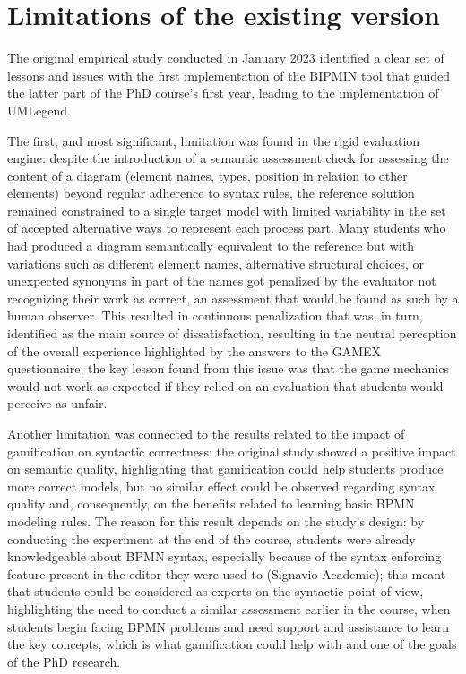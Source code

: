 \section{Limitations of the existing version}

The original empirical study conducted in January 2023 identified a clear set of lessons and issues with the first implementation of the BIPMIN tool that guided the latter part of the PhD course's first year, leading to the implementation of UMLegend.

The first, and most significant, limitation was found in the rigid evaluation engine: despite the introduction of a semantic assessment check for assessing the content of a diagram (element names, types, position in relation to other elements) beyond regular adherence to syntax rules, the reference solution remained constrained to a single target model with limited variability in the set of accepted alternative ways to represent each process part. Many students who had produced a diagram semantically equivalent to the reference but with variations such as different element names, alternative structural choices, or unexpected synonyms in part of the names got penalized by the evaluator not recognizing their work as correct, an assessment that would be found as such by a human observer. This resulted in continuous penalization that was, in turn, identified as the main source of dissatisfaction, resulting in the neutral perception of the overall experience highlighted by the answers to the GAMEX questionnaire; the key lesson found from this issue was that the game mechanics would not work as expected if they relied on an evaluation that students would perceive as unfair. 

Another limitation was connected to the results related to the impact of gamification on syntactic correctness: the original study showed a positive impact on semantic quality, highlighting that gamification could help students produce more correct models, but no similar effect could be observed regarding syntax quality and, consequently, on the benefits related to learning basic BPMN modeling rules. The reason for this result depends on the study's design: by conducting the experiment at the end of the course, students were already knowledgeable about BPMN syntax, especially because of the syntax enforcing feature present in the editor they were used to (Signavio Academic); this meant that students could be considered as experts on the syntactic point of view, highlighting the need to conduct a similar assessment earlier in the course, when students begin facing BPMN problems and need support and assistance to learn the key concepts, which is what gamification could help with and one of the goals of the PhD research.

